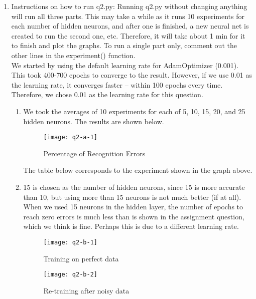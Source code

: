 \documentclass[11pt]{article}
\begin{document}
\begin{enumerate}
\pagebreak
\item Instructions on how to run q2.py:\newline
\newline
Running q2.py without changing anything will run all three parts. This may take a while as it runs 10 experiments for each number of hidden neurons, and after one is finished, a new neural net is created to run the second one, etc. Therefore, it will take about 1 min for it to finish and plot the graphs. To run a single part only, comment out the other lines in the experiment() function.\\
We started by using the default learning rate for AdamOptimizer (0.001). This took 400-700 epochs to converge to the result. However, if we use 0.01 as the learning rate, it converges faster -- within 100 epochs every time. Therefore, we chose 0.01 as the learning rate for this question.\\

% 
\begin{enumerate}
\item We took the averages of 10 experiments for each of 5, 10, 15, 20, and 25 hidden neurons. The results are shown below.\newline

\begin{figure}[h!]
    \centering
     \texttt{[image: q2-a-1]}
        \caption{Percentage of Recognition Errors}
\end{figure}

The table below corresponds to the experiment shown in the graph above.\newline


\item 15 is chosen as the number of hidden neurons, since 15 is more accurate than 10, but using more than 15 neurons is not much better (if at all). When we used 15 neurons in the hidden layer, the number of epochs to reach zero errors is much less than is shown in the assignment question, which we think is fine. Perhaps this is due to a different learning rate.\\
\begin{figure}[h!]
    \centering
    \begin{minipage}{0.45\textwidth}
    	\centering
        \texttt{[image: q2-b-1]} %
        \caption{Training on perfect data}
    \end{minipage}\hfill
    \begin{minipage}{0.45\textwidth}
    	\centering
         \texttt{[image: q2-b-2]} %
         \caption{Re-training after noisy data}
    \end{minipage}\hfill
\end{figure}


\end{enumerate}
\end{enumerate}
\end{document}
